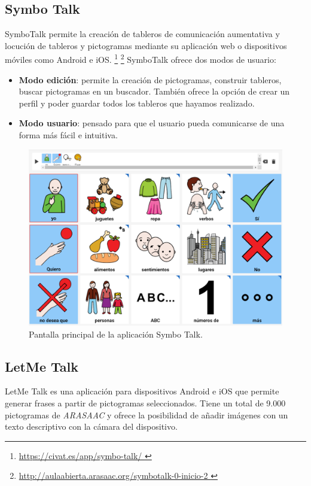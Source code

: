 	


\newpage	
\subsection{Symbo Talk}

SymboTalk permite la creación de tableros de comunicación aumentativa y locución de tableros y pictogramas mediante su aplicación web o dispositivos móviles como Android e iOS.
\footnote{\url{  https://civat.es/app/symbo-talk/ }}
\footnote{\url{   http://aulaabierta.arasaac.org/symbotalk-0-inicio-2  }}
SymboTalk ofrece dos modos de usuario:

\begin{itemize}
	\item \textbf{Modo edición}: permite la creación de pictogramas, construir tableros, buscar pictogramas en un buscador. También ofrece la opción de crear un perfil y poder guardar todos los tableros que hayamos realizado.
	
	\item \textbf{Modo usuario}: pensado para que el usuario pueda comunicarse de una forma más fácil e intuitiva.
	
\end{itemize}

\begin{figure}[h!]
	\centering
	\includegraphics[width=0.7\linewidth]{Imagenes/Bitmap/SymboTalk}
	\caption{Pantalla principal de la aplicación Symbo Talk.}
	\label{fig:symbotalk}
\end{figure}

\newpage
\subsection{LetMe Talk}

LetMe Talk es una aplicación para dispositivos Android e iOS que permite generar frases a partir de pictogramas seleccionados. Tiene un total de 9.000 pictogramas de \textit{ARASAAC} y ofrece la posibilidad de añadir imágenes con un texto descriptivo con la cámara del dispositivo.

